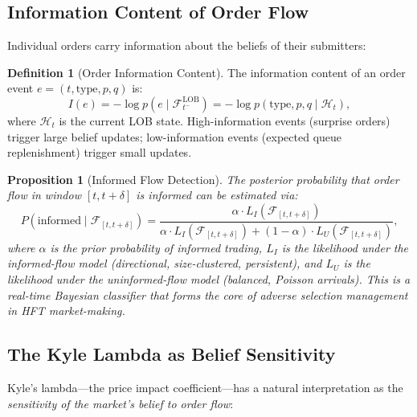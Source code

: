\documentclass[12pt,a4paper]{article}
\newtheorem{proposition}[theorem]{Proposition}
\theoremstyle{definition}
\newtheorem{definition}[theorem]{Definition}
\newcommand{\F}{\mathcal{F}}
\newcommand{\HH}{\mathcal{H}}
\begin{document}
\subsection{Information Content of Order Flow}

Individual orders carry information about the beliefs of their submitters:

\begin{definition}[Order Information Content]\label{def:order-info}
The information content of an order event $e = (t, \text{type}, p, q)$ is:
\begin{equation}
  I(e) = -\log p(e \mid \F_{t^-}^{\mathrm{LOB}}) = -\log p(\text{type}, p, q \mid \HH_t),
\end{equation}
where $\HH_t$ is the current LOB state. High-information events (surprise orders) trigger large belief updates; low-information events (expected queue replenishment) trigger small updates.
\end{definition}

\begin{proposition}[Informed Flow Detection]\label{prop:informed-flow}
The posterior probability that order flow in window $[t, t+\delta]$ is informed can be estimated via:
\begin{equation}
  P(\text{informed} \mid \F_{[t,t+\delta]}) = \frac{\alpha \cdot L_I(\F_{[t,t+\delta]})}{\alpha \cdot L_I(\F_{[t,t+\delta]}) + (1-\alpha) \cdot L_U(\F_{[t,t+\delta]})},
\end{equation}
where $\alpha$ is the prior probability of informed trading, $L_I$ is the likelihood under the informed-flow model (directional, size-clustered, persistent), and $L_U$ is the likelihood under the uninformed-flow model (balanced, Poisson arrivals). This is a real-time Bayesian classifier that forms the core of adverse selection management in HFT market-making.
\end{proposition}

\subsection{The Kyle Lambda as Belief Sensitivity}

Kyle's lambda---the price impact coefficient---has a natural interpretation as the \emph{sensitivity of the market's belief to order flow}:
\end{document}
